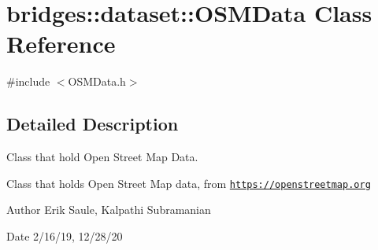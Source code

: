 \hypertarget{classbridges_1_1dataset_1_1_o_s_m_data}{}\section{bridges\+:\+:dataset\+:\+:O\+S\+M\+Data Class Reference}
\label{classbridges_1_1dataset_1_1_o_s_m_data}


{\ttfamily \#include $<$O\+S\+M\+Data.\+h$>$}



\subsection{Detailed Description}
Class that hold Open Street Map Data. 

Class that holds Open Street Map data, from \href{https://openstreetmap.org}{\tt https\+://openstreetmap.\+org}

\begin{DoxyAuthor}{Author}
Erik Saule, Kalpathi Subramanian 
\end{DoxyAuthor}
\begin{DoxyDate}{Date}
2/16/19, 12/28/20 
\end{DoxyDate}
